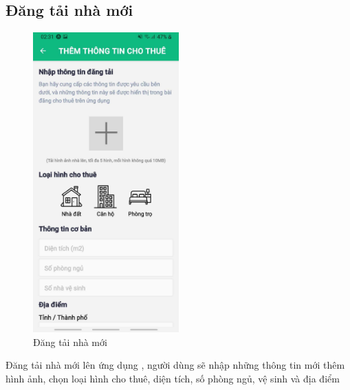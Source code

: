 \subsection{Đăng tải nhà mới}
\begin{figure}[H]
    \centering
    \includegraphics[width=0.5\textwidth]{Images/app_image/app_10.jpg}
    \caption{Đăng tải nhà mới}
\end{figure}
Đăng tải nhà mới lên ứng dụng , người dùng sẽ nhập những thông tin mới thêm hình ảnh, chọn loại hình cho thuê, diện tích, số phòng ngủ, vệ sinh và địa điểm
